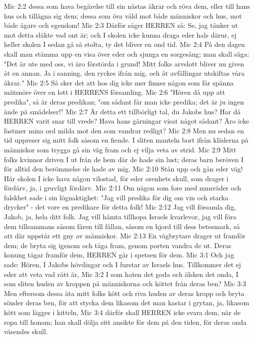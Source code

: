 Mic 2:2  dessa som hava begärelse till sin nästas åkrar och röva dem, eller till hans hus och tillägna sig dem; dessa som öva våld mot både människor och hus, mot både ägare och egendom!
Mic 2:3  Därför säger HERREN så: Se, jag tänker ut mot detta släkte vad ont är; och I skolen icke kunna draga eder hals därur, ej heller skolen I sedan gå så stolta, ty det bliver en ond tid.
Mic 2:4  På den dagen skall man stämma upp en visa över eder och sjunga en sorgesång; man skall säga: "Det är ute med oss, vi äro förstörda i grund! Mitt folks arvslott bliver nu given åt en annan. Ja i sanning, den ryckes ifrån mig, och åt avfällingar utskiftas våra åkrar."
Mic 2:5  Så sker det att hos dig icke mer finnes någon som får spänna mätsnöre över en lott i HERRENS församling.
Mic 2:6  "Hören då upp att predika", så är deras predikan; "om sådant får man icke predika; det är ju ingen ände på smädelser!"
Mic 2:7  Är detta ett tillbörligt tal, du Jakobs hus? Har då HERREN varit snar till vrede? Hava hans gärningar visat något sådant? Äro icke fastmer mina ord milda mot den som vandrar redligt?
Mic 2:8  Men nu sedan en tid uppreser sig mitt folk såsom en fiende. I sliten manteln bort ifrån kläderna på människor som trygga gå sin väg fram och ej vilja veta av strid.
Mic 2:9  Mitt folks kvinnor driven I ut från de hem där de hade sin lust; deras barn beröven I för alltid den berömmelse de hade av mig.
Mic 2:10  Stån upp och gån eder väg! Här skolen I icke hava någon vilostad, för eder orenhets skull, som drager i fördärv, ja, i gruvligt fördärv.
Mic 2:11  Om någon som fore med munväder och falskhet sade i sin lögnaktighet: "Jag vill predika för dig om vin och starka drycker" - det vore en predikare för detta folk!
Mic 2:12  Jag vill församla dig, Jakob, ja, hela ditt folk. Jag vill hämta tillhopa Israels kvarlevor, jag vill föra dem tillsammans såsom fåren till fållan, såsom en hjord till dess betesmark, så att där uppstår ett gny av människor.
Mic 2:13  En vägbrytare drager ut framför dem; de bryta sig igenom och tåga fram, genom porten vandra de ut. Deras konung tågar framför dem, HERREN går i spetsen för dem.
Mic 3:1  Och jag sade: Hören, I Jakobs hövdingar och I furstar av Israels hus. Tillkommer det ej eder att veta vad rätt är,
Mic 3:2  I som haten det goda och älsken det onda, I som sliten huden av kroppen på människorna och köttet från deras ben?
Mic 3:3  Men eftersom dessa äta mitt folks kött och riva huden av deras kropp och bryta sönder deras ben, för att stycka dem likasom det man kastar i grytan, ja, likasom kött som lägges i kitteln,
Mic 3:4  därför skall HERREN icke svara dem, när de ropa till honom; han skall dölja sitt ansikte för dem på den tiden, för deras onda väsendes skull.
